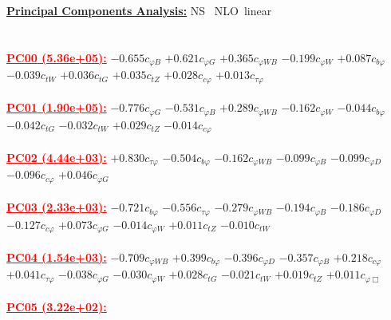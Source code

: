\documentclass{article}
\begin{document}
\noindent \underline{\bf{Principal Components Analysis}:} \rm NS \ NLO\ linear\\ \\ \\
\noindent \textcolor{red}{\underline{\bf{PC00} (5.36e+05):}}
{$-0.655$}{\rm $c_{\varphi B}$} 
{$+0.621$}{\rm $c_{\varphi G}$} 
{$+0.365$}{\rm $c_{\varphi WB}$} 
{$-0.199$}{\rm $c_{\varphi W}$} 
{$+0.087$}{\rm $c_{b \varphi}$} 
{$-0.039$}{\rm $c_{tW}$} 
{$+0.036$}{\rm $c_{tG}$} 
{$+0.035$}{\rm $c_{tZ}$} 
{$+0.028$}{\rm $c_{c \varphi}$} 
{$+0.013$}{\rm $c_{\tau \varphi}$} 
 \nonumber \\ \nonumber \\ 
\noindent \textcolor{red}{\underline{\bf{PC01} (1.90e+05):}}
{$-0.776$}{\rm $c_{\varphi G}$} 
{$-0.531$}{\rm $c_{\varphi B}$} 
{$+0.289$}{\rm $c_{\varphi WB}$} 
{$-0.162$}{\rm $c_{\varphi W}$} 
{$-0.044$}{\rm $c_{b \varphi}$} 
{$-0.042$}{\rm $c_{tG}$} 
{$-0.032$}{\rm $c_{tW}$} 
{$+0.029$}{\rm $c_{tZ}$} 
{$-0.014$}{\rm $c_{c \varphi}$} 
 \nonumber \\ \nonumber \\ 
\noindent \textcolor{red}{\underline{\bf{PC02} (4.44e+03):}}
{$+0.830$}{\rm $c_{\tau \varphi}$} 
{$-0.504$}{\rm $c_{b \varphi}$} 
{$-0.162$}{\rm $c_{\varphi WB}$} 
{$-0.099$}{\rm $c_{\varphi B}$} 
{$-0.099$}{\rm $c_{\varphi D}$} 
{$-0.096$}{\rm $c_{c \varphi}$} 
{$+0.046$}{\rm $c_{\varphi G}$} 
 \nonumber \\ \nonumber \\ 
\noindent \textcolor{red}{\underline{\bf{PC03} (2.33e+03):}}
{$-0.721$}{\rm $c_{b \varphi}$} 
{$-0.556$}{\rm $c_{\tau \varphi}$} 
{$-0.279$}{\rm $c_{\varphi WB}$} 
{$-0.194$}{\rm $c_{\varphi B}$} 
{$-0.186$}{\rm $c_{\varphi D}$} 
{$-0.127$}{\rm $c_{c \varphi}$} 
{$+0.073$}{\rm $c_{\varphi G}$} 
{$-0.014$}{\rm $c_{\varphi W}$} 
{$+0.011$}{\rm $c_{tZ}$} 
{$-0.010$}{\rm $c_{tW}$} 
 \nonumber \\ \nonumber \\ 
\noindent \textcolor{red}{\underline{\bf{PC04} (1.54e+03):}}
{$-0.709$}{\rm $c_{\varphi WB}$} 
{$+0.399$}{\rm $c_{b \varphi}$} 
{$-0.396$}{\rm $c_{\varphi D}$} 
{$-0.357$}{\rm $c_{\varphi B}$} 
{$+0.218$}{\rm $c_{c \varphi}$} 
{$+0.041$}{\rm $c_{\tau \varphi}$} 
{$-0.038$}{\rm $c_{\varphi G}$} 
{$-0.030$}{\rm $c_{\varphi W}$} 
{$+0.028$}{\rm $c_{tG}$} 
{$-0.021$}{\rm $c_{tW}$} 
{$+0.019$}{\rm $c_{tZ}$} 
{$+0.011$}{\rm $c_{\varphi \Box}$} 
 \nonumber \\ \nonumber \\ 
\noindent \textcolor{red}{\underline{\bf{PC05} (3.22e+02):}}
\end{document}
